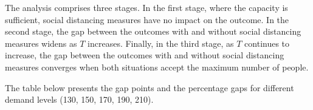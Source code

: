 The analysis comprises three stages. In the first stage, where the capacity is sufficient, social distancing measures have no impact on the outcome. In the second stage, the gap between the outcomes with and without social distancing measures widens as $T$ increases. Finally, in the third stage, as $T$ continues to increase, the gap between the outcomes with and without social distancing measures converges when both situations accept the maximum number of people.

The table below presents the gap points and the percentage gaps for different demand levels (130, 150, 170, 190, 210).


